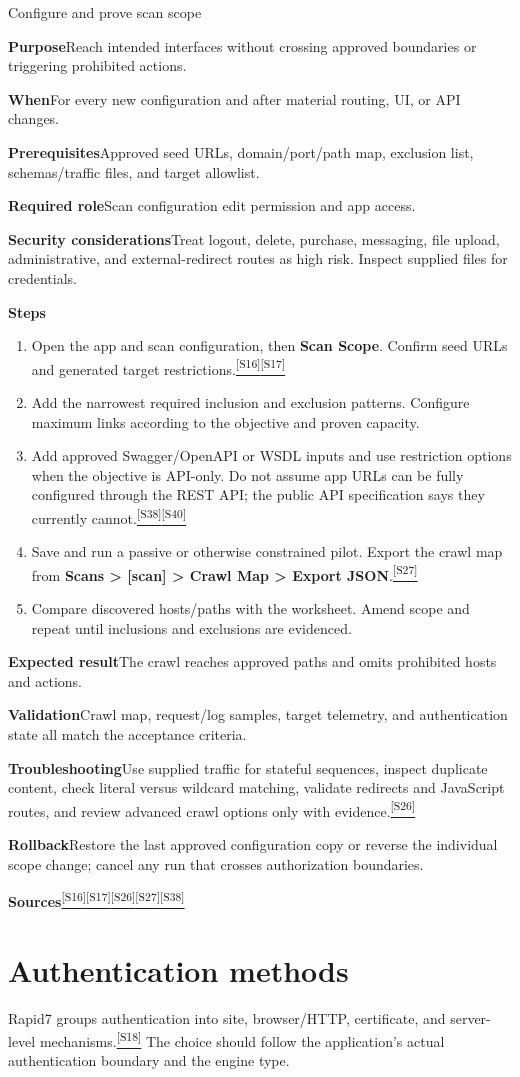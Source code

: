 \documentclass[11pt,letterpaper,oneside]{scrreprt}
\newcommand{\src}[1]{\hyperref[src:#1]{\textsuperscript{\color{R7Orange}[#1]}}}
\newcommand{\uipath}[1]{\textsf{\textbf{#1}}}
\newcommand{\field}[1]{\par\smallskip\noindent\textbf{#1}\quad}
\begin{document}
\begin{procedure}{Configure and prove scan scope}
\field{Purpose}Reach intended interfaces without crossing approved boundaries or triggering prohibited actions.
\field{When}For every new configuration and after material routing, UI, or API changes.
\field{Prerequisites}Approved seed URLs, domain/port/path map, exclusion list, schemas/traffic files, and target allowlist.
\field{Required role}Scan configuration edit permission and app access.
\field{Security considerations}Treat logout, delete, purchase, messaging, file upload, administrative, and external-redirect routes as high risk. Inspect supplied files for credentials.
\field{Steps}
\begin{enumerate}
  \item Open the app and scan configuration, then \uipath{Scan Scope}. Confirm seed URLs and generated target restrictions.\src{S16}\src{S17}
  \item Add the narrowest required inclusion and exclusion patterns. Configure maximum links according to the objective and proven capacity.
  \item Add approved Swagger/OpenAPI or WSDL inputs and use restriction options when the objective is API-only. Do not assume app URLs can be fully configured through the REST API; the public API specification says they currently cannot.\src{S38}\src{S40}
  \item Save and run a passive or otherwise constrained pilot. Export the crawl map from \uipath{Scans > [scan] > Crawl Map > Export JSON}.\src{S27}
  \item Compare discovered hosts/paths with the worksheet. Amend scope and repeat until inclusions and exclusions are evidenced.
\end{enumerate}
\field{Expected result}The crawl reaches approved paths and omits prohibited hosts and actions.
\field{Validation}Crawl map, request/log samples, target telemetry, and authentication state all match the acceptance criteria.
\field{Troubleshooting}Use supplied traffic for stateful sequences, inspect duplicate content, check literal versus wildcard matching, validate redirects and JavaScript routes, and review advanced crawl options only with evidence.\src{S26}
\field{Rollback}Restore the last approved configuration copy or reverse the individual scope change; cancel any run that crosses authorization boundaries.
\field{Sources}\src{S16}\src{S17}\src{S26}\src{S27}\src{S38}
\end{procedure}

\section{Authentication methods}
Rapid7 groups authentication into site, browser/HTTP, certificate, and server-level mechanisms.\src{S18} The choice should follow the application's actual authentication boundary and the engine type.
\end{document}
